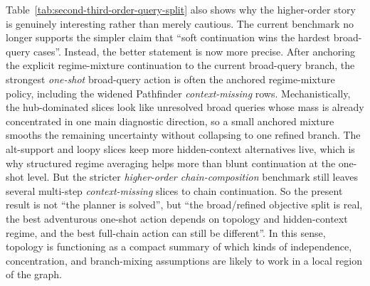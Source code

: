 \documentclass[11pt,openany]{report}
\begin{document}
Table~\ref{tab:second-third-order-query-split} also shows why the
higher-order story is genuinely interesting rather than merely cautious.
The current benchmark no longer supports the simpler claim that ``soft
continuation wins the hardest broad-query cases''.  Instead, the better
statement is now more precise.  After anchoring the explicit
regime-mixture continuation to the current broad-query branch, the
strongest \emph{one-shot} broad-query action is often the anchored
regime-mixture policy, including the widened Pathfinder
\emph{context-missing} rows.  Mechanistically, the hub-dominated slices
look like unresolved broad queries whose mass is already concentrated in
one main diagnostic direction, so a small anchored mixture smooths the
remaining uncertainty without collapsing to one refined branch.  The
alt-support and loopy slices keep more hidden-context alternatives live,
which is why structured regime averaging helps more than blunt
 continuation at the one-shot level.  But the stricter
\emph{higher-order chain-composition} benchmark still leaves several
multi-step \emph{context-missing} slices to  chain
continuation.  So the present result is not ``the planner is solved'',
but ``the broad/refined objective split is real, the best adventurous
one-shot action depends on topology and hidden-context regime, and the
best full-chain action can still be different''.  In this sense,
topology is functioning as a compact summary of which kinds of
independence, concentration, and branch-mixing assumptions are likely to
work in a local region of the graph.
\end{document}
